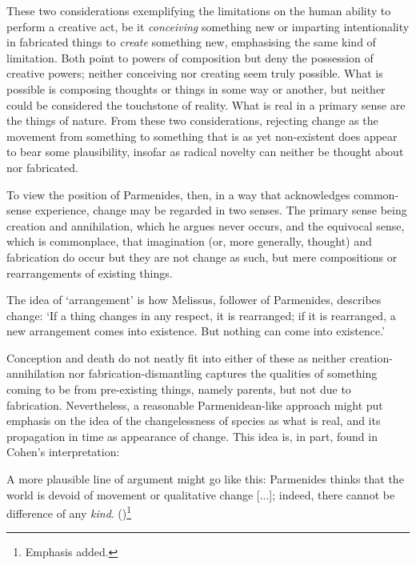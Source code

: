 These two considerations exemplifying the limitations on the human ability to perform a creative act, be it \emph{conceiving} something new or imparting intentionality in fabricated things to \emph{create} something new, emphasising the same kind of limitation. Both point to powers of composition but deny the possession of creative powers; neither conceiving nor creating seem truly possible. What is possible is composing thoughts or things in some way or another, but neither could be considered the touchstone of reality. What is real in a primary sense are the things of nature. From these two considerations, rejecting change as the movement from something to something that is as yet non-existent does appear to bear some plausibility, insofar as radical novelty can neither be thought about nor fabricated.

To view the position of Parmenides, then, in a way that acknowledges common-sense experience, change may be regarded in two senses. The primary sense being creation and annihilation, which he argues never occurs, and the equivocal sense, which is commonplace, that imagination (or, more generally, thought) and fabrication do occur but they are not change as such, but mere compositions or rearrangements of existing things.
\begin{quoting}
The idea of `arrangement' is how Melissus, follower of Parmenides, describes change: `If a thing changes in any respect, it is rearranged; if it is rearranged, a new arrangement comes into existence. But nothing can come into existence.' \parencite[][]{cohen-parm1}
\end{quoting}
Conception and death do not neatly fit into either of these as neither creation-annihilation nor fabrication-dismantling captures the qualities of something coming to be from pre-existing things, namely parents, but not due to fabrication. Nevertheless, a reasonable Parmenidean-like approach might put emphasis on the idea of the changelessness of species as what is real, and its propagation in time as appearance of change. This idea is, in part, found in Cohen's interpretation:
\begin{quoting}
A more plausible line of argument might go like this: Parmenides thinks that the world is devoid of movement or qualitative change [...]; indeed, there cannot be difference of any \emph{kind}. (\citeyear[][]{cohen-parm1})\footnote{Emphasis added.}
\end{quoting}


